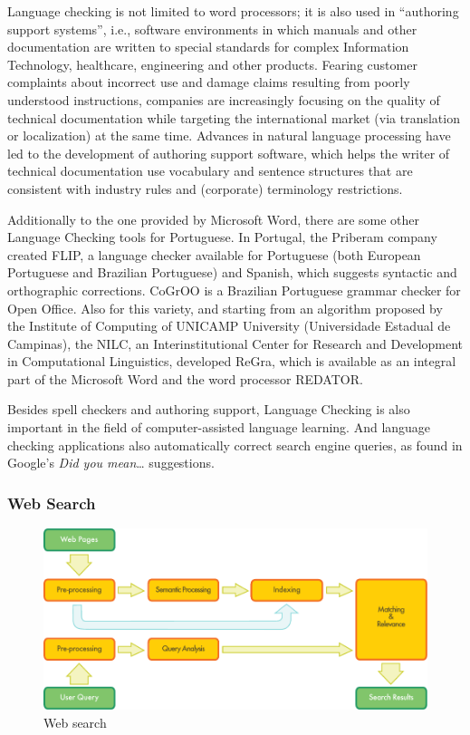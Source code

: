 \begin{multicols}{2}
 Language checking is not limited to word processors; it is also used in “authoring support systems”, i.e., software environments in which manuals and other documentation are written to special standards for complex Information Technology, healthcare, engineering and other products. Fearing customer complaints about incorrect use and damage claims resulting from poorly understood instructions, companies are increasingly focusing on the quality of technical documentation while targeting the international market (via translation or localization) at the same time. Advances in natural language processing have led to the development of authoring support software, which helps the writer of technical documentation use vocabulary and sentence structures that are consistent with industry rules and (corporate) terminology restrictions.

   Additionally to the one provided by Microsoft Word, there are some other Language Checking tools for Portuguese. In Portugal, the Priberam company created FLIP, a language checker available for Portuguese (both European Portuguese and Brazilian Portuguese) and Spanish, which suggests syntactic and orthographic corrections. CoGrOO is a Brazilian Portuguese grammar checker for Open Office. Also for this variety, and starting from an algorithm proposed by the Institute of Computing of UNICAMP University (Universidade Estadual de Campinas), the NILC, an Interinstitutional Center for Research and Development in Computational Linguistics, developed ReGra, which is available as an integral part of the Microsoft Word and the word processor REDATOR. 

Besides spell checkers and authoring support, Language Checking is also important in the field of computer-assisted language learning. And language checking applications also automatically correct search engine queries, as found in Google's \textit{Did you mean}… suggestions.

\subsubsection{Web Search}

\begin{figure}[htb]
  \center
  \includegraphics[width=\textwidth]{../_media/english/web_search_architecture}
  \caption{Web search}
  \label{fig:websearcharch_en}
 \end{figure}


\end{multicols}
